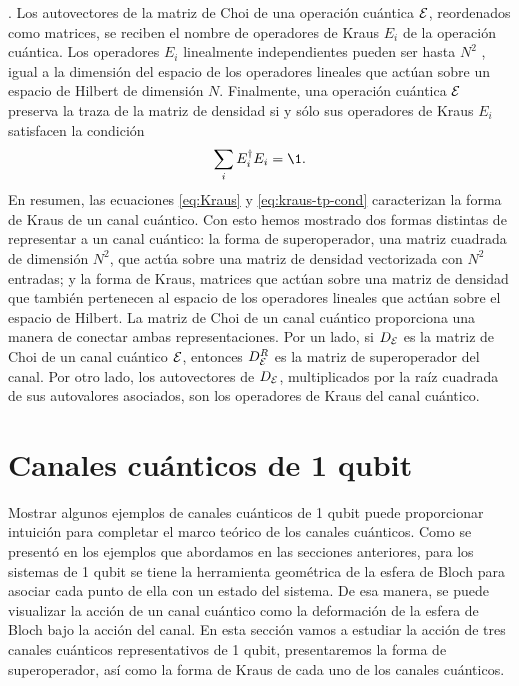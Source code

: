 \cite{bengtsson_zyczkowski_2017}.
Los autovectores de la matriz de Choi de una operación cuántica $\mathcal{E}$,
reordenados como matrices, se
reciben el nombre de operadores de Kraus $E_i$ de la operación cuántica.
Los operadores $E_i$ linealmente independientes  
pueden ser hasta $N^2$ \cite{nielsen_chuang_2011}, igual a la dimensión 
del espacio de los operadores lineales que actúan sobre un espacio de
Hilbert de dimensión $N$. 
Finalmente, una operación cuántica $\mathcal{E}$ preserva la traza de la matriz de densidad 
si y sólo sus operadores de Kraus $E_i$ satisfacen la condición
\cite{bengtsson_zyczkowski_2017}
\begin{align}
\sum_iE_i^{\dagger}E_i=\1.
\label{eq:kraus-tp-cond}
\end{align}
En resumen, las ecuaciones \eqref{eq:Kraus} y \eqref{eq:kraus-tp-cond}
caracterizan la forma de Kraus de un canal cuántico. 
Con esto hemos mostrado dos formas distintas de representar a un 
canal cuántico: la forma de superoperador, una matriz cuadrada
de dimensión $N^2$, que actúa sobre una matriz de densidad vectorizada 
con $N^2$ entradas; y la forma de Kraus, matrices que actúan sobre
una matriz de densidad que también pertenecen al espacio de 
los operadores lineales que actúan sobre el espacio de Hilbert. La matriz de 
Choi de un canal cuántico proporciona una manera de conectar ambas 
representaciones. Por un lado, si $D_{\mathcal{E}}$ es la matriz de Choi de un canal 
cuántico $\mathcal{E}$, entonces $D_{\mathcal{E}}^R$ es la matriz de superoperador
del canal.
Por otro lado, los autovectores de $D_{\mathcal{E}}$,
multiplicados por la raíz cuadrada de sus autovalores asociados,
son los operadores de Kraus del canal cuántico. 

\section{Canales cuánticos de 1 qubit}
%
%
Mostrar algunos ejemplos de canales cuánticos de 1 qubit 
puede proporcionar intuición 
para completar el marco teórico de los canales cuánticos. 
Como se presentó en los ejemplos que abordamos en las 
secciones anteriores, para los sistemas de 1 qubit se tiene la
herramienta geométrica de la esfera de Bloch para asociar cada 
punto de ella con un estado del sistema. De esa manera, 
se puede visualizar la acción de un canal cuántico como la 
deformación de la esfera de Bloch bajo la acción del canal.
En esta sección vamos a estudiar la acción de tres canales 
cuánticos representativos de 1 qubit, presentaremos
la forma de superoperador, así como la forma de Kraus de 
cada uno de los canales cuánticos.

